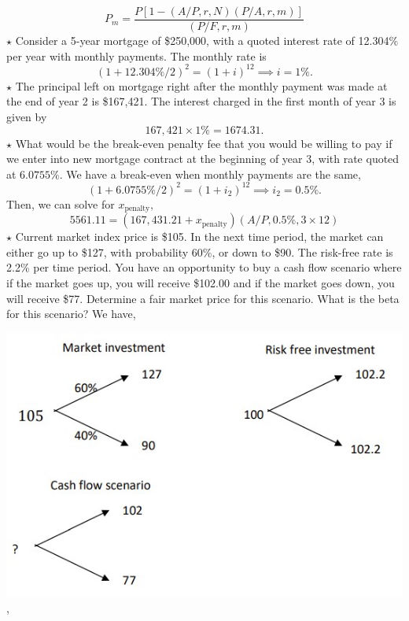 \documentclass[11pt,landscape]{article}
\begin{document}
\begin{multicols*}{3}
\begin{equation*}
    P_m = \frac{P\left[1-(A/P,r,N)(P/A,r,m)\right]}{(P/F,r,m)}
\end{equation*}
$\star$ Consider a 5-year mortgage of \$250,000, with a quoted interest rate of 12.304\% per year with monthly payments. The monthly rate is 
\begin{equation*}
    (1+12.304\%/2)^2 = (1+i)^{12} \implies i = 1\%.
\end{equation*}
$\star$ The principal left on mortgage right after the monthly payment was made at the end of year 2 is \$167,421. The interest charged in the first month of year 3 is given by
\begin{equation*}
    167,421 \times 1\% = 1674.31.
\end{equation*}
$\star$ What would be the break-even penalty fee that you would be willing to pay if we enter into new mortgage contract at the beginning of year 3, with rate quoted at $6.0755\%.$ We have a break-even when monthly payments are the same,
\begin{equation*}
    (1+6.0755\%/2)^2 = (1+i_2)^{12} \implies i_2 = 0.5\%.
\end{equation*}
Then, we can solve for $x_\text{penalty},$
\begin{equation*}
    5561.11 = (167,431.21 + x_\text{penalty})(A/P, 0.5\%, 3\times 12)
\end{equation*}
$\star$ Current market index price is \$105. In the next time period, the market can either go up to \$127, with probability 60\%, or down to \$90. The risk-free rate is 2.2\% per time
period. You have an opportunity to buy a cash flow scenario where if the market goes
up, you will receive \$102.00 and if the market goes down, you will receive \$77.
Determine a fair market price for this scenario. What is the beta for this scenario? We have,
\begin{center}
    \includegraphics[width=0.8\linewidth]{risk.jpg},

\end{center}
\end{multicols*}
\end{document}
